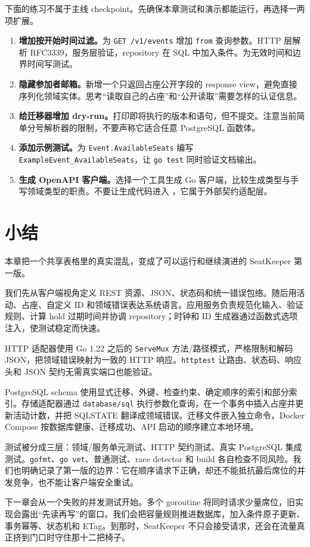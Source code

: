 下面的练习不属于主线 checkpoint。先确保本章测试和演示都能运行，再选择一两项扩展。

\begin{enumerate}
  \item \textbf{增加按开始时间过滤。}为 \texttt{GET /v1/events} 增加 \texttt{from} 查询参数。HTTP 层解析 RFC3339，服务层验证，repository 在 SQL 中加入条件。为无效时间和边界时间写测试。
  \item \textbf{隐藏参加者邮箱。}新增一个只返回占座公开字段的 response view，避免直接序列化领域实体。思考“读取自己的占座”和“公开读取”需要怎样的认证信息。
  \item \textbf{给迁移器增加 dry-run。}打印即将执行的版本和语句，但不提交。注意当前简单分号解析器的限制，不要声称它适合任意 PostgreSQL 函数体。
  \item \textbf{添加示例测试。}为 \texttt{Event.AvailableSeats} 编写 \texttt{ExampleEvent\_AvailableSeats}，让 \texttt{go test} 同时验证文档输出。
  \item \textbf{生成 OpenAPI 客户端。}选择一个工具生成 Go 客户端，比较生成类型与手写领域类型的职责。不要让生成代码进入 ，它属于外部契约适配层。
\end{enumerate}

\section*{小结}

本章把一个共享表格里的真实混乱，变成了可以运行和继续演进的 SeatKeeper 第一版。

我们先从客户端视角定义 REST 资源、JSON、状态码和统一错误包络。随后用活动、占座、自定义 ID 和领域错误表达系统语言。应用服务负责规范化输入、验证规则、计算 hold 过期时间并协调 repository；时钟和 ID 生成器通过函数式选项注入，使测试稳定而快速。

HTTP 适配器使用 Go 1.22 之后的 \texttt{ServeMux} 方法/路径模式，严格限制和解码 JSON，把领域错误映射为一致的 HTTP 响应。\texttt{httptest} 让路由、状态码、响应头和 JSON 契约无需真实端口也能验证。

PostgreSQL schema 使用显式迁移、外键、检查约束、确定顺序的索引和部分索引。存储适配器通过 \texttt{database/sql} 执行参数化查询，在一个事务中插入占座并更新活动计数，并把 SQLSTATE 翻译成领域错误。迁移文件嵌入独立命令，Docker Compose 按数据库健康、迁移成功、API 启动的顺序建立本地环境。

测试被分成三层：领域/服务单元测试、HTTP 契约测试、真实 PostgreSQL 集成测试。\texttt{gofmt}、\texttt{go vet}、普通测试、race detector 和 build 各自检查不同风险。我们也明确记录了第一版的边界：它在顺序请求下正确，却还不能抵抗最后席位的并发竞争，也不能让客户端安全重试。

下一章会从一个失败的并发测试开始。多个 goroutine 将同时请求少量席位，旧实现会露出“先读再写”的窗口。我们会把容量规则推进数据库，加入条件原子更新、事务幂等、状态机和 ETag。到那时，SeatKeeper 不只会接受请求，还会在流量真正挤到门口时守住那十二把椅子。
